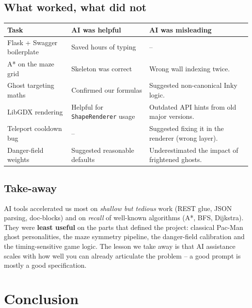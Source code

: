 \documentclass[11pt,a4paper]{article}
\begin{document}
\subsection{What worked, what did not}

\begin{table}[h]
\centering\small
\renewcommand{\arraystretch}{1.15}
\begin{tabularx}{\linewidth}{l X X}
\toprule
\textbf{Task} & \textbf{AI was helpful} & \textbf{AI was misleading} \\
\midrule
Flask + Swagger boilerplate & Saved hours of typing            & -- \\
A* on the maze grid         & Skeleton was correct             & Wrong wall indexing twice. \\
Ghost targeting maths       & Confirmed our formulas           & Suggested non-canonical Inky logic. \\
LibGDX rendering            & Helpful for \texttt{ShapeRenderer} usage & Outdated API hints from old major versions. \\
Teleport cooldown bug       & --                               & Suggested fixing it in the renderer (wrong layer). \\
Danger-field weights        & Suggested reasonable defaults    & Underestimated the impact of frightened ghosts. \\
\bottomrule
\end{tabularx}
\end{table}

\subsection{Take-away}

AI tools accelerated us most on \emph{shallow but tedious} work
(REST glue, JSON parsing, doc-blocks) and on \emph{recall} of well-known
algorithms (A*, BFS, Dijkstra). They were \textbf{least useful} on the
parts that defined the project: classical Pac-Man ghost personalities,
the maze symmetry pipeline, the danger-field calibration and the
timing-sensitive game logic. The lesson we take away is that AI
assistance scales with how well you can already articulate the problem
-- a good prompt is mostly a good specification.

\section{Conclusion}
\end{document}
